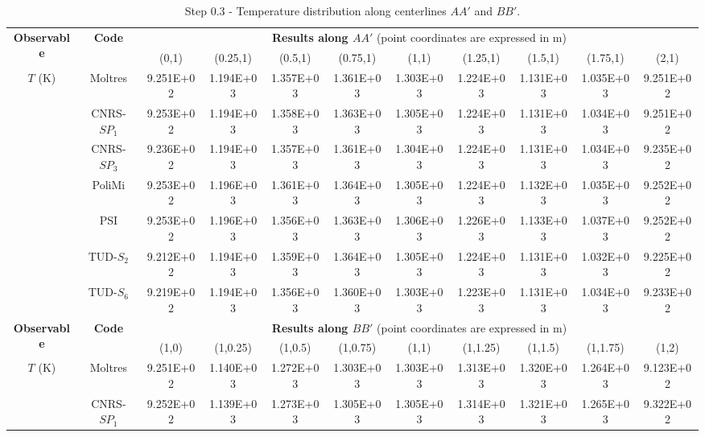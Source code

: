 \begin{table}[htbp!]
	\caption{Step 0.3 - Temperature distribution along centerlines $AA'$ and $BB'$.}
	\label{table:0.3}
	\centering
	\footnotesize
	\setlength\tabcolsep{1.5pt}
	\hspace*{-2cm}
	\renewcommand{\arraystretch}{.8}
	\begin{tabular}{c c c c c c c c c c c}
		\toprule
		\multirow{2}{*}{\textbf{Observable}} & \multirow{2}{*}{\textbf{Code}} & \multicolumn{9}{c}{\textbf{Results along $AA'$} (point coordinates are expressed in m)} \\
		& & {(0,1)} & {(0.25,1)} & {(0.5,1)} & {(0.75,1)} & {(1,1)} & {(1.25,1)} & {(1.5,1)} & {(1.75,1)} & {(2,1)} \\
		\midrule
		\multirow{7}{*}{$T$ (K)} & Moltres & 9.251E+02 & 1.194E+03 & 1.357E+03 & 1.361E+03 &
		1.303E+03 & 1.224E+03 & 1.131E+03 & 1.035E+03 & 9.251E+02 \\
		& CNRS-$SP_1$ & 9.253E+02 & 1.194E+03 & 1.358E+03 & 1.363E+03 & 1.305E+03 & 1.224E+03 & 1.131E+03 & 1.034E+03 & 9.251E+02 \\
		& CNRS-$SP_3$ & 9.236E+02 & 1.194E+03 & 1.357E+03 & 1.361E+03 & 1.304E+03 & 1.224E+03 & 1.131E+03 & 1.034E+03 & 9.235E+02 \\
		& PoliMi & 9.253E+02 & 1.196E+03 & 1.361E+03 & 1.364E+03 & 1.305E+03 & 1.224E+03 & 1.132E+03 & 1.035E+03 & 9.252E+02 \\
		& PSI & 9.253E+02 & 1.196E+03 & 1.356E+03 & 1.363E+03 & 1.306E+03 & 1.226E+03 & 1.133E+03 & 1.037E+03 & 9.252E+02 \\
		& TUD-$S_2$ & 9.212E+02 & 1.194E+03 & 1.359E+03 & 1.364E+03 & 1.305E+03 & 1.224E+03 & 1.131E+03 & 1.032E+03 & 9.225E+02 \\
		& TUD-$S_6$ & 9.219E+02 & 1.194E+03 & 1.356E+03 & 1.360E+03 & 1.303E+03 & 1.223E+03 & 1.131E+03 & 1.034E+03 & 9.233E+02 \\
		\midrule
		\midrule
		\multirow{2}{*}{\textbf{Observable}} & \multirow{2}{*}{\textbf{Code}} & \multicolumn{9}{c}{\textbf{Results along $BB'$} (point coordinates are expressed in m)} \\
		& & {(1,0)} & {(1,0.25)} & {(1,0.5)} & {(1,0.75)} & {(1,1)} & {(1,1.25)} & {(1,1.5)} & {(1,1.75)} & {(1,2)} \\
		\midrule
		\multirow{7}{*}{$T$ (K)} & Moltres & 9.251E+02 & 1.140E+03 & 1.272E+03 & 1.303E+03 &
		1.303E+03 & 1.313E+03 & 1.320E+03 & 1.264E+03 & 9.123E+02 \\
		& CNRS-$SP_1$ & 9.252E+02 & 1.139E+03 & 1.273E+03 & 1.305E+03 & 1.305E+03 & 1.314E+03 & 1.321E+03 & 1.265E+03 & 9.322E+02 \\

\end{tabular}
\end{table}
